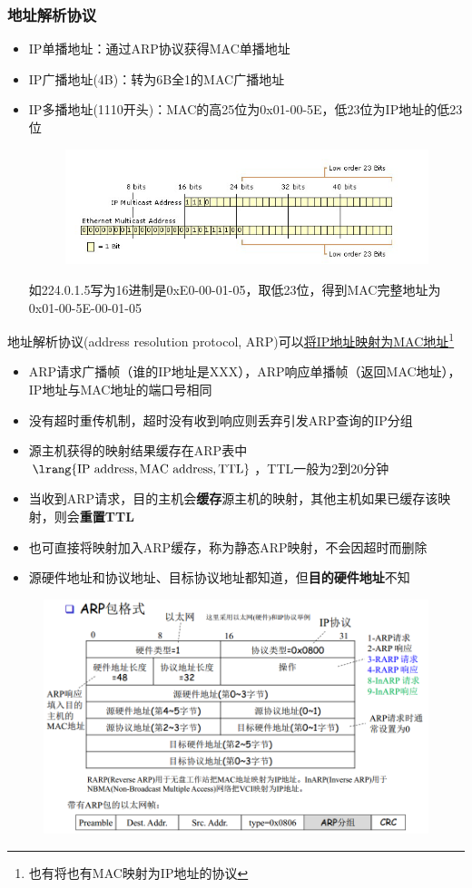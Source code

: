\subsubsection{地址解析协议}
\begin{itemize}
	\item IP单播地址：通过ARP协议获得MAC单播地址
	\item IP广播地址(4B)：转为6B全1的MAC广播地址
	\item IP多播地址(1110开头)：MAC的高25位为0x01-00-5E，低23位为IP地址的低23位
	\begin{figure}[H]
		\centering
		\includegraphics[width=0.8\linewidth]{fig/ip_mac.png}
	\end{figure}
	如224.0.1.5写为16进制是0xE0-00-01-05，取低23位，得到MAC完整地址为0x01-00-5E-00-01-05
\end{itemize}

地址解析协议(address resolution protocol, ARP)可以\underline{将IP地址映射为MAC地址}\footnote{也有将也有MAC映射为IP地址的协议}
\begin{itemize}
	\item ARP请求广播帧（谁的IP地址是XXX），ARP响应单播帧（返回MAC地址），IP地址与MAC地址的端口号相同
	\item 没有超时重传机制，超时没有收到响应则丢弃引发ARP查询的IP分组
	\item 源主机获得的映射结果缓存在ARP表中$\lrang{\text{IP address},\text{MAC address},\text{TTL}}$，TTL一般为2到20分钟
	\item 当收到ARP请求，目的主机会\textbf{缓存}源主机的映射，其他主机如果已缓存该映射，则会\textbf{重置TTL}
	\item 也可直接将映射加入ARP缓存，称为静态ARP映射，不会因超时而删除
	\item 源硬件地址和协议地址、目标协议地址都知道，但\textbf{目的硬件地址}不知
\end{itemize}
\begin{figure}[H]
	\centering
	\includegraphics[width=0.7\linewidth]{fig/ARP.PNG}
\end{figure}


